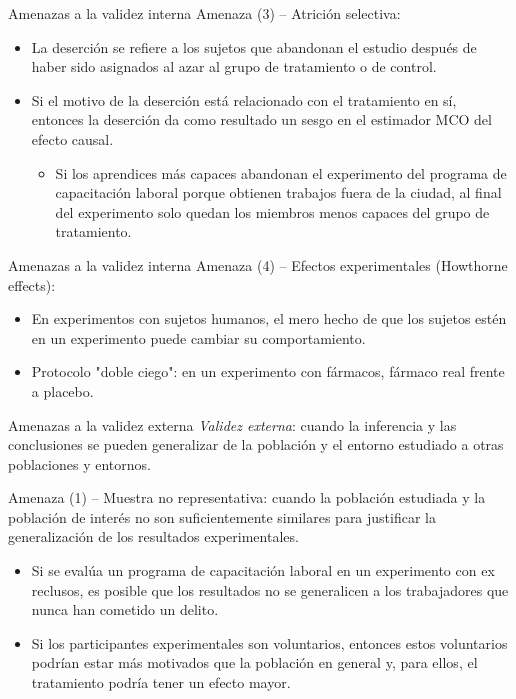 \documentclass[11pt, aspectratio=169, compress]{beamer}
\begin{document}
\begin{frame}{Amenazas a la validez interna}
	Amenaza (3) -- Atrición selectiva:
	\begin{itemize}
		\item La deserción se refiere a los sujetos que abandonan el estudio después de haber sido asignados al azar al grupo de tratamiento o de control.
		\item Si el motivo de la deserción está relacionado con el tratamiento en sí, entonces la deserción da como resultado un sesgo en el estimador MCO del efecto causal.
		
		\begin{itemize}
			\item Si los aprendices más capaces abandonan el experimento del programa de capacitación laboral porque obtienen trabajos fuera de la ciudad, al final del experimento solo quedan los miembros menos capaces del grupo de tratamiento.
		\end{itemize}
	\end{itemize}
\end{frame}
\begin{frame}{Amenazas a la validez interna}
	Amenaza (4) -- Efectos experimentales (Howthorne effects): 
	\begin{itemize}
		\item En experimentos con sujetos humanos, el mero hecho de que los sujetos estén en un experimento puede cambiar su comportamiento.
		\item Protocolo "doble ciego": en un experimento con fármacos, fármaco real frente a placebo.
	\end{itemize}
\end{frame}
\begin{frame}{Amenazas a la validez externa}
	\textit{Validez externa}: cuando la inferencia y las conclusiones se pueden generalizar de la población y el entorno estudiado a otras poblaciones y entornos.
	
	Amenaza (1) -- Muestra no representativa: cuando la población estudiada y la población de interés no son suficientemente similares para justificar la generalización de los resultados experimentales.
	
	\begin{itemize}
		\item Si se evalúa un programa de capacitación laboral en un experimento con ex reclusos, es posible que los resultados no se generalicen a los trabajadores que nunca han cometido un delito.
		\item Si los participantes experimentales son voluntarios, entonces estos voluntarios podrían estar más motivados que la población en general y, para ellos, el tratamiento podría tener un efecto mayor.
	\end{itemize}
\end{frame}
\end{document}
